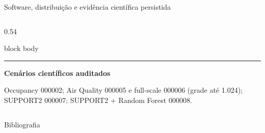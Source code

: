 \begin{frame}{Software, distribuição e evidência científica persistida}
\begin{columns}[T,onlytextwidth]
\begin{column}{0.54\textwidth}
\begin{beamercolorbox}[wd=\linewidth,sep=.15cm,rounded=true]{block body}
\begin{itemize}
        \end{itemize}
        \vspace{.09cm}\hrule\vspace{.09cm}
        {\bfseries\color{CoInfoBlue}Cenários científicos auditados}\par
        {\fontsize{8.2}{9.8}\selectfont Occupancy 000002; Air Quality 000005 e full-scale 000006 (grade até 1.024); SUPPORT2 000007; SUPPORT2 + Random Forest 000008.}
      \end{beamercolorbox}
    \end{column}
  \end{columns}
\end{frame}

\begin{frame}[allowframebreaks]{Bibliografia}
  \nocite{*}
  \printbibliography[heading=none]
\end{frame}
